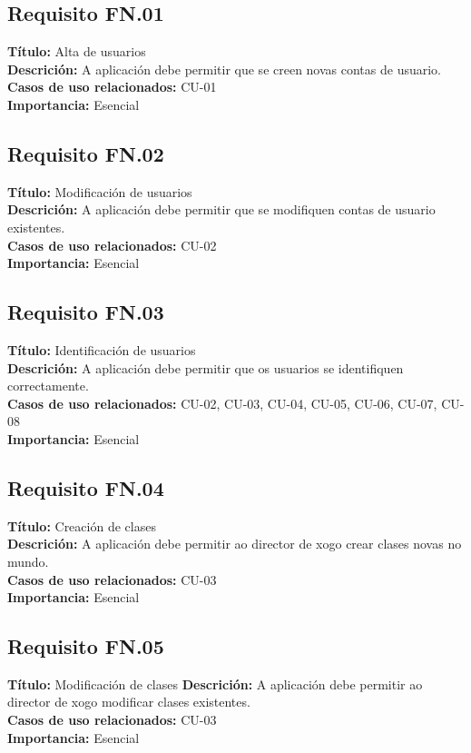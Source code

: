 \subsection{Requisito FN.01}
{\bf Título:} Alta de usuarios\\
{\bf Descrición:} A aplicación debe permitir que se creen novas contas de usuario.\\
{\bf Casos de uso relacionados:} CU-01\\
{\bf Importancia:} Esencial

\subsection{Requisito FN.02}
{\bf Título:} Modificación de usuarios\\
{\bf Descrición:} A aplicación debe permitir que se modifiquen contas de usuario existentes.\\
{\bf Casos de uso relacionados:} CU-02\\
{\bf Importancia:} Esencial

\subsection{Requisito FN.03}
{\bf Título:} Identificación de usuarios\\
{\bf Descrición:} A aplicación debe permitir que os usuarios se identifiquen correctamente.\\
{\bf Casos de uso relacionados:} CU-02, CU-03, CU-04, CU-05, CU-06, CU-07, CU-08\\
{\bf Importancia:} Esencial

\subsection{Requisito FN.04}
{\bf Título:} Creación de clases\\
{\bf Descrición:} A aplicación debe permitir ao director de xogo crear clases novas no mundo.\\
{\bf Casos de uso relacionados:} CU-03\\
{\bf Importancia:} Esencial

\subsection{Requisito FN.05}
{\bf Título:} Modificación de clases
{\bf Descrición:} A aplicación debe permitir ao director de xogo modificar clases existentes.\\
{\bf Casos de uso relacionados:} CU-03\\
{\bf Importancia:} Esencial

